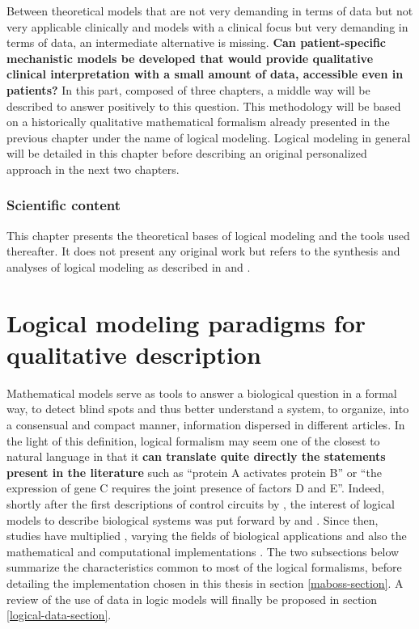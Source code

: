 \documentclass[a4paper,12pt,twoside,onecolumn,openright,final,oldfontcommands]{memoir}
\let\BeginKnitrBlock\begin \let\EndKnitrBlock\end
\begin{document}
Between theoretical models that are not very demanding in terms of data
but not very applicable clinically and models with a clinical focus but
very demanding in terms of data, an intermediate alternative is missing.
\textbf{Can patient-specific mechanistic models be developed that would
provide qualitative clinical interpretation with a small amount of data,
accessible even in patients?} In this part, composed of three chapters,
a middle way will be described to answer positively to this question.
This methodology will be based on a historically qualitative
mathematical formalism already presented in the previous chapter under
the name of logical modeling. Logical modeling in general will be
detailed in this chapter before describing an original personalized
approach in the next two chapters.

\BeginKnitrBlock{summarybox}
\subsubsection*{Scientific content}\label{scientific-content-1}

This chapter presents the theoretical bases of logical modeling and the
tools used thereafter. It does not present any original work but refers
to the synthesis and analyses of logical modeling as described in
\citet{beal2019personalization} and \citet{beal2020modelisation}.
\EndKnitrBlock{summarybox}

\section{Logical modeling paradigms for qualitative
description}\label{logical-modeling-paradigms-for-qualitative-description}

Mathematical models serve as tools to answer a biological question in a
formal way, to detect blind spots and thus better understand a system,
to organize, into a consensual and compact manner, information dispersed
in different articles. In the light of this definition, logical
formalism may seem one of the closest to natural language in that it
\textbf{can translate quite directly the statements present in the
literature} such as ``protein A activates protein B'' or ``the
expression of gene C requires the joint presence of factors D and E''.
Indeed, shortly after the first descriptions of control circuits by
\citet{jacob1961genetic}, the interest of logical models to describe
biological systems was put forward by \citet{kauffman1969homeostasis}
and \citet{thomas1973boolean}. Since then, studies have multiplied
\citep{thomas1990biological}, varying the fields of biological
applications and also the mathematical and computational implementations
\citep{naldi2018colomoto}. The two subsections below summarize the
characteristics common to most of the logical formalisms, before
detailing the implementation chosen in this thesis in section
\ref{maboss-section}. A review of the use of data in logic models will
finally be proposed in section \ref{logical-data-section}.
\end{document}
